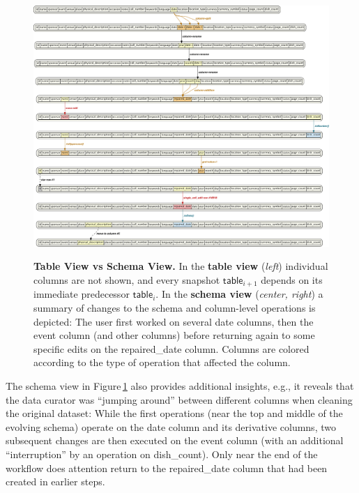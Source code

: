 \documentclass[conference]{ijdc-v14}
\newcommand{\Figref}[1]{Figure\,\ref{#1}}
\newcommand{\co}[1]{\textsf{\small{#1}}}
\begin{document}
\begin{figure}[t]
{\includegraphics[height=0.4\textheight]{idcc2021/figures/schema_view-crop.pdf}} 
\caption{\textbf{Table View vs Schema View.} In the \textbf{table view} (\emph{left}) individual
  columns are not shown, and every snapshot $\mathsf{table}_{i+1}$ depends on its immediate
  predecessor $\mathsf{table}_i$. In the \textbf{schema view} (\emph{center, right}) a summary of
  changes to the schema and column-level operations is depicted: The user first worked on several
  \textsf{date} columns, then the \textsf{event} column (and other columns) before returning again
  to some specific edits on the \textsf{repaired\_date} column. Columns are colored according to the
  type of operation that affected the column.}
    \label{fig:linear_view}
\end{figure}


 
 
 
The schema view in \Figref{fig:linear_view} also provides additional insights, e.g., it reveals that
the data curator was ``jumping around'' between different columns when cleaning the original
dataset: While the first operations (near the top and middle of the evolving schema) operate on the
\co{date} column and its derivative columns, two subsequent changes are then executed on the
\co{event} column (with an additional ``interruption'' by an operation on \co{dish\_count}). Only
near the end of the workflow does attention return to the \co{repaired\_date} column that had been
created in earlier steps.
\end{document}
